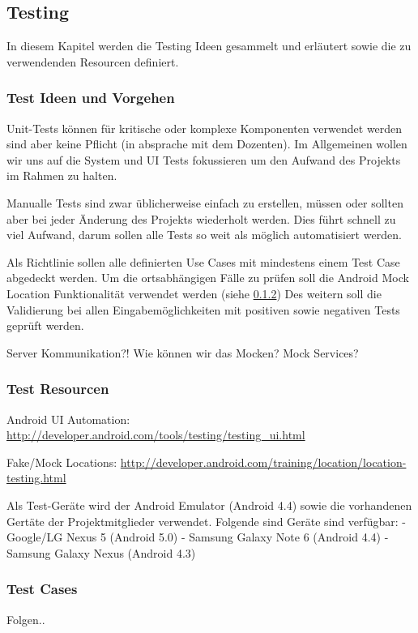 \subsection{Testing}
In diesem Kapitel werden die Testing Ideen gesammelt und erläutert sowie die zu verwendenden Resourcen definiert.

\subsubsection{Test Ideen und Vorgehen}
Unit-Tests können für kritische oder komplexe Komponenten verwendet werden sind aber keine Pflicht (in absprache mit dem Dozenten). 
Im Allgemeinen wollen wir uns auf die System und UI Tests fokussieren um den Aufwand des Projekts im Rahmen zu halten.

Manualle Tests sind zwar üblicherweise einfach zu erstellen, müssen oder sollten aber bei jeder Änderung des Projekts wiederholt werden. Dies führt schnell zu viel Aufwand, darum sollen alle Tests so weit als möglich automatisiert werden.

Als Richtlinie sollen alle definierten Use Cases mit mindestens einem Test Case abgedeckt werden. Um die ortsabhängigen Fälle zu prüfen soll die Android Mock Location Funktionalität verwendet werden (siehe \ref{test_resources})
Des weitern soll die Validierung bei allen Eingabemöglichkeiten mit positiven sowie negativen Tests geprüft werden.

Server Kommunikation?! Wie können wir das Mocken? Mock Services?

\subsubsection{Test Resourcen}
\label{test_resources}
Android UI Automation: \url{http://developer.android.com/tools/testing/testing_ui.html}

Fake/Mock Locations: \url{http://developer.android.com/training/location/location-testing.html}

Als Test-Geräte wird der Android Emulator (Android 4.4) sowie die vorhandenen Gertäte der Projektmitglieder verwendet. 
Folgende sind Geräte sind verfügbar:
- Google/LG Nexus 5 (Android 5.0)
- Samsung Galaxy Note 6 (Android 4.4)
- Samsung Galaxy Nexus (Android 4.3)


\subsubsection{Test Cases}
Folgen..